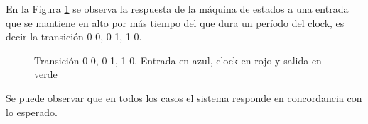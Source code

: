 En la Figura \ref{fig:GRAPH2} se observa la respuesta de la m\'aquina de estados a una entrada que se mantiene en alto por m\'as tiempo del que dura un per\'iodo del clock, es decir la transici\'on 0-0, 0-1, 1-0.
\begin{figure}[H]
    \centering
    \caption{Transici\'on 0-0, 0-1, 1-0. Entrada en azul, clock en rojo y salida en verde}
    \label{fig:GRAPH2}
\end{figure}

Se puede observar que en todos los casos el sistema responde en concordancia con lo esperado.